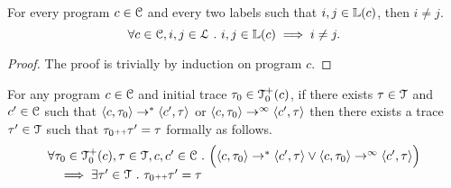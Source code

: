 \begin{lem}
  For every program $c \in \mathcal{C}$ and every two labels such that
  $i, j \in \mathbb{L}(c)$, then $i \neq j$.
  \[
    \forall c \in \mathcal{C}, i, j \in \mathcal{L} ~.~ i, j \in \mathbb{L}(c)\implies i \neq j.
    \]
\end{lem}
  \begin{proof}
    The proof is trivially by induction on program $c$.
  \end{proof}
  \begin{lem}
    For any program $c \in \mathcal{C}$ and initial trace $\mathtt{\tau}_0 \in \mathcal{T}^{+}_0(c)$,
    if there exists $\mathtt{\tau} \in \mathcal{T}$ and $c' \in \mathcal{C} $ such that $\langle c, \mathtt{\tau}_0 \rangle \rightarrow^{*} \langle c', \mathtt{\tau} \rangle $ or 
    $\langle c, \mathtt{\tau}_0 \rangle \rightarrow^{\infty} \langle c', \mathtt{\tau} \rangle$  
    then there exists a trace $\mathtt{\tau}' \in \mathcal{T}$ such that $\mathtt{\tau}_0 {\scriptscriptstyle ++} \mathtt{\tau}' = \mathtt{\tau}$ formally as follows.
    \[
      \begin{array}{l}
      \forall \mathtt{\tau}_0 \in \mathcal{T}^{+}_0(c), \mathtt{\tau} \in \mathcal{T}, c, c' \in \mathcal{C} ~.~
      \Big( \langle c, \mathtt{\tau}_0 \rangle \rightarrow^{*} \langle c', \mathtt{\tau} \rangle 
      \lor  \langle c, \mathtt{\tau}_0 \rangle \rightarrow^{\infty} \langle c', \mathtt{\tau} \rangle \Big)
      \\ \quad
      \implies \exists \mathtt{\tau}' \in \mathcal{T} ~.~ \mathtt{\tau}_0 {\scriptscriptstyle ++} \mathtt{\tau}' = \mathtt{\tau} 
      \end{array}
      \]
      \end{lem}
